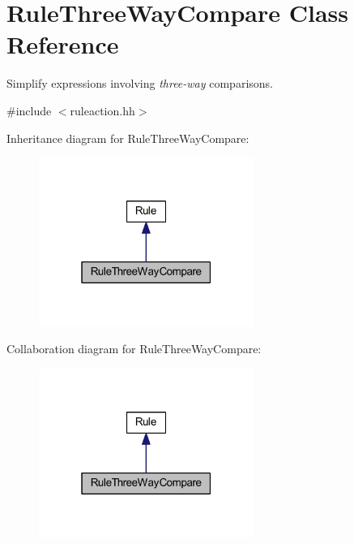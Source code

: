 \hypertarget{class_rule_three_way_compare}{}\section{Rule\+Three\+Way\+Compare Class Reference}
\label{class_rule_three_way_compare}


Simplify expressions involving {\itshape three-\/way} comparisons.  




{\ttfamily \#include $<$ruleaction.\+hh$>$}



Inheritance diagram for Rule\+Three\+Way\+Compare\+:
\nopagebreak
\begin{figure}[H]
\begin{center}
\leavevmode
\includegraphics[width=199pt]{class_rule_three_way_compare__inherit__graph}
\end{center}
\end{figure}


Collaboration diagram for Rule\+Three\+Way\+Compare\+:
\nopagebreak
\begin{figure}[H]
\begin{center}
\leavevmode
\includegraphics[width=199pt]{class_rule_three_way_compare__coll__graph}
\end{center}
\end{figure}
